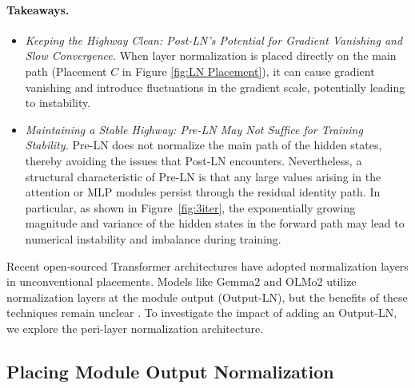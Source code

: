 \paragraph{Takeaways.}
\begin{itemize}
\item \textit{Keeping the Highway Clean: Post-LN’s Potential for Gradient Vanishing and Slow Convergence.} When layer normalization is placed directly on the main path (Placement $C$ in Figure \ref{fig:LN Placement}), it can cause gradient vanishing and introduce fluctuations in the gradient scale, potentially leading to instability. 

\item \textit{Maintaining a Stable Highway: Pre-LN May Not Suffice for Training Stability.} Pre-LN does not normalize the main path of the hidden states, thereby avoiding the issues that Post-LN encounters. Nevertheless, a structural characteristic of Pre-LN is that any large values arising in the attention or MLP modules persist through the residual identity path. In particular, as shown in Figure~\ref{fig:3iter}, the exponentially growing magnitude and variance of the hidden states in the forward path may lead to numerical instability and imbalance during training.
\end{itemize}

Recent open-sourced Transformer architectures have adopted normalization layers in unconventional placements. Models like Gemma$2$ and OLMo$2$ utilize normalization layers at the module output (Output-LN), but the benefits of these techniques remain unclear \citep{gemma2, olmo2}. To investigate the impact of adding an Output-LN, we explore the peri-layer normalization architecture.


\subsection{Placing Module Output Normalization}
\label{subsec:peri_ln}

